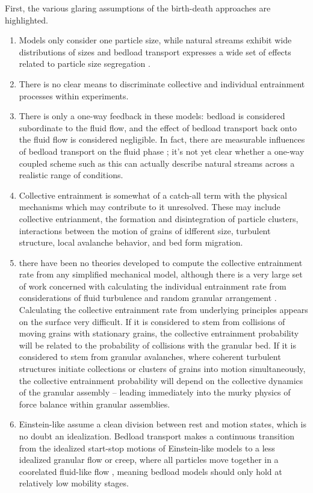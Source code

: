 First, the various glaring assumptions of the birth-death approaches are highlighted. 
\begin{enumerate}
\item Models only consider one particle size, while natural streams exhibit wide distributions of sizes and bedload transport expresses a wide set of effects related to particle size segregation \citep{Wilcock2003, Parker1982, Chen2008}. 
\item There is no clear means to discriminate collective and individual entrainment processes within experiments. 
\item There is only a one-way feedback in these models: bedload is considered subordinate to the fluid flow, and the effect of bedload transport back onto the fluid flow is considered negligible. In fact, there are measurable influences of bedload transport on the fluid phase \citep{}; it's not yet clear whether a one-way coupled scheme such as this can actually describe natural streams across a realistic range of conditions. 
\item Collective entrainment is somewhat of a catch-all term with the physical mechanisms which may contribute to it unresolved. These may include collective entrianment, the formation and disintegration of particle clusters, interactions between the motion of grains of idfferent size, turbulent structure, local avalanche behavior, and bed form migration. 
\item there have been no theories developed to compute the collective entrainment rate from any simplified mechanical model, although there is a very large set of work concerned with calculating the individual entrainment rate from considerations of fluid turbulence and random granular arrangement \citep{Einstein1949, Einstein1950, Grass1970, Paintal1971, Cheng1998, Wu2004, Dey2008, Tregnaghi2012, Dey2018}. Calculating the collective entrainment rate from underlying principles appears on the surface very difficult. If it is considered to stem from collisions of moving grains with stationary grains, the collective entrainment probability will be related to the probability of collisions with the granular bed. If it is considered to stem from granular avalanches, where coherent turbulent structures initiate collections or clusters of grains into motion simultaneously, the collective entrainment probability will depend on the collective dynamics of the granular assembly -- leading immediately into the murky physics of force balance within granular assemblies.
\item Einstein-like assume a clean division between rest and motion states, which is no doubt an idealization. Bedload transport makes a continuous transition from the idealized start-stop motions of Einstein-like models to a less idealized granular flow or creep, where all particles move together in a coorelated fluid-like flow \citep{}, meaning bedload models should only hold at relatively low mobility stages. 

\end{enumerate}

